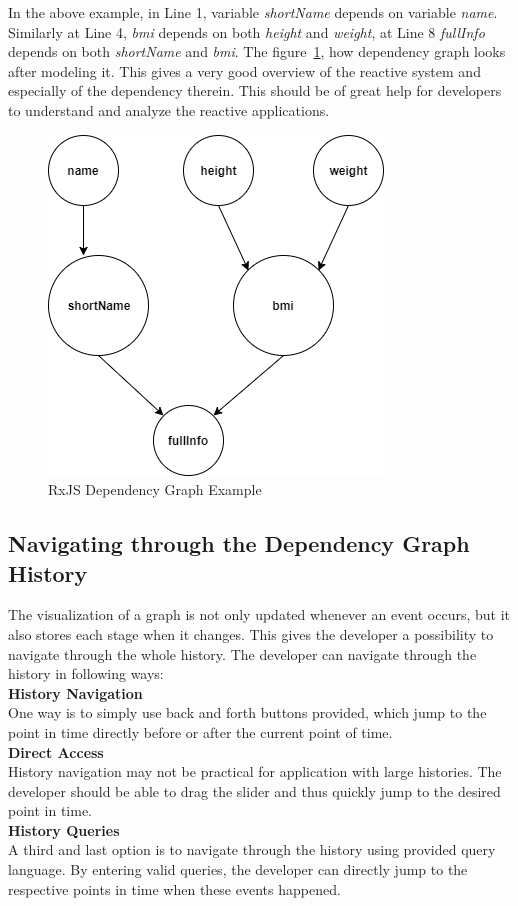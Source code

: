 In the above example, in Line 1, variable \textit{shortName} depends on variable \textit{name}. Similarly at Line 4, \textit{bmi} depends on both \textit{height} and \textit{weight}, at Line 8 \textit{fullInfo} depends on both \textit{shortName} and \textit{bmi}. The figure~\ref{fig:rxjs-dependency-graph-example}, how dependency graph looks after modeling it. This gives a very good overview of the reactive system and especially of the dependency therein. This should be of great help for developers to understand and analyze the reactive applications. 

\begin{figure}[!h]
	\centering
	\includegraphics[scale=0.5,trim=0 0 0 0]{images/rxjs-dependency-graph-example.png}
	\caption{RxJS Dependency Graph Example}
	\label{fig:rxjs-dependency-graph-example}
\end{figure}

\subsection{Navigating through the Dependency Graph History}
The visualization of a graph is not only updated whenever an event occurs, but it also stores each stage when it changes. This gives the developer a possibility to navigate through the whole history. The developer can navigate through the history in following ways:
\\
\textbf{History Navigation}
\\
One way is to simply use back and forth buttons provided, which jump to the point in time directly before or after the current point of time.
\\
\textbf{Direct Access}
\\
History navigation may not be practical for application with large histories. The developer should be able to drag the slider and thus quickly jump to the desired point in time.
\\
\textbf{History Queries}
\\
A third and last option is to navigate through the history using provided query language. By entering valid queries, the developer can directly jump to the respective points in time when these events happened.

